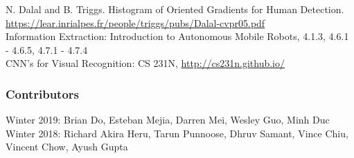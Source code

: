 \documentclass[twoside]{article}
\begin{document}
N. Dalal and B. Triggs. Histogram of Oriented Gradients for Human Detection. \url{https://lear.inrialpes.fr/people/triggs/pubs/Dalal-cvpr05.pdf} \\
Information Extraction: Introduction to Autonomous Mobile Robots, 4.1.3, 4.6.1 - 4.6.5, 4.7.1 - 4.7.4 \\
CNN's for Visual Recognition: CS 231N, \url{http://cs231n.github.io/}

\subsubsection*{Contributors}
Winter 2019: Brian Do, Esteban Mejia, Darren Mei, Wesley Guo, Minh Duc
\\
Winter 2018: Richard Akira Heru, Tarun Punnoose, Dhruv Samant, Vince Chiu, Vincent Chow, Ayush Gupta
\end{document}
